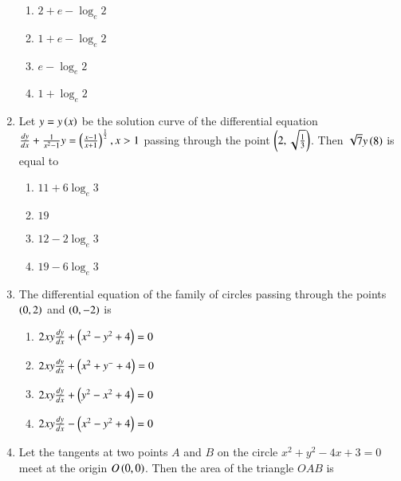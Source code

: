 \documentclass[journal]{IEEEtran}
\begin{document}
\begin{enumerate}
        \begin{multicols}{4}
            \begin{enumerate}
                \item $2+e-\log_e2$
                \item $1+e-\log_e2$
                \item $e-\log_e2$
                \item $1+\log_e2$
            \end{enumerate}
        \end{multicols}
        
    \item Let $y=y\left(x\right)$ be the solution curve of the differential equation $\frac{dy}{dx}+\frac{1}{x^2-1}y=\left(\frac{x-1}{x+1}\right)^{\frac{1}{2}},x>1$ passing through the point $\left(2,\sqrt{\frac{1}{3}}\right)$. Then $\sqrt{7}y\left(8\right)$ is equal to

        \begin{multicols}{4}
            \begin{enumerate}
                \item $11+6\log_e3$
                \item $19$
                \item $12-2\log_e3$
                \item $19-6\log_e3$
            \end{enumerate}
        \end{multicols}

    \item The differential equation of the family of circles passing through the points $\left(0,2\right)$ and $\left(0,-2\right)$ is

        \begin{multicols}{2}
            \begin{enumerate}
                \item $2xy\frac{dy}{dx}+\left(x^2-y^2+4\right)=0$
                \item $2xy\frac{dy}{dx}+\left(x^2+y^-+4\right)=0$
                \item $2xy\frac{dy}{dx}+\left(y^2-x^2+4\right)=0$
                \item $2xy\frac{dy}{dx}-\left(x^2-y^2+4\right)=0$
            \end{enumerate}
        \end{multicols}
        
    \item Let the tangents at two points $A$ and $B$ on the circle $x^2+y^2-4x+3=0$ meet at the origin $O\left(0,0\right)$. Then the area of the triangle $OAB$ is


\end{enumerate}
\end{document}

